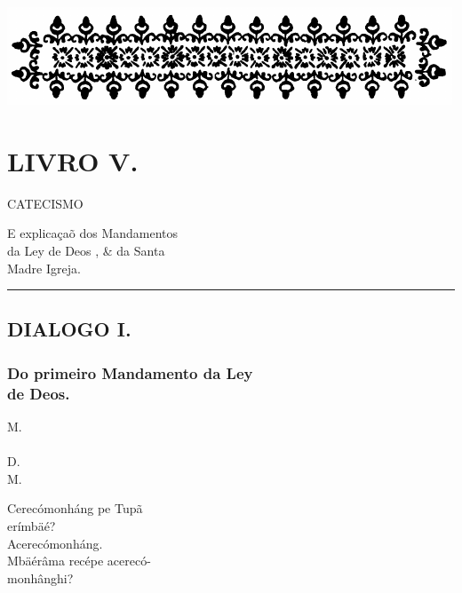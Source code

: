\documentclass[openany,titlepage,12pt]{book}
\renewcommand{\chaptermark}[1]{\markboth{#1}{}}
\renewcommand{\sectionmark}[1]{\gdef\rightmark{#1}}
\newcommand{\lgS}{\char"017F}
\begin{document}

\begin{center}
    \vspace*{20pt}
    \includegraphics[scale=0.40]{12.livro3.png}
\end{center}
\unskip
\vspace{-30pt}
{\let\clearpage\relax \chapter{\Huge LIVRO V.}}
\unskip
\vspace{-2pt}
\begin{center}
    {\large CATECISMO}
\end{center}
\unskip
\unskip\vspace{25pt}
\begin{center}
    E explicaçaõ dos Mandamentos\\
    da Ley de Deos , \& da Santa\\
    Madre Igreja.
\end{center}
\unskip\vspace{25pt}
\par\noindent\rule{\textwidth}{0.4pt}
\unskip\vspace{-3pt}
\section{DIALOGO I.}
\unskip\vspace{-3pt}
\subsection{Do primeiro Mandamento da Ley\\
de Deos.}
\chaptermark{Dialogo I.}
\sectionmark{Honrarás hum \lgS ó Deos.
}

\hspace*{-1.5ex}\begin{minipage}[t]{0.03\linewidth}
    M.\\ \\D.\\M.\\ 
\end{minipage}
\hspace*{1ex}\begin{minipage}[t]{1.08\linewidth}
    \lettrine
    [findent =-2pt, nindent=0pt, loversize=-0.2, lraise=0.05, lines=5]
    {}{C}erecómonháng pe Tupã\\
    \hspace*{2ex}erímbäé?\\
    Acerecómonháng.\\
    Mbäérâma recépe acerecó-\\
    \hspace*{2ex}monhânghi?
\end{minipage}
\end{document}
